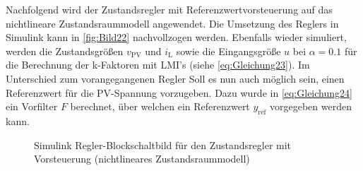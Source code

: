 Nachfolgend wird der Zustandsregler mit Referenzwertvorsteuerung auf das nichtlineare Zustandsraummodell angewendet. Die Umsetzung des Reglers in Simulink kann in \autoref{fig:Bild22} nachvollzogen werden. Ebenfalls wieder simuliert, werden die Zustandsgrößen $v_{\mathrm{PV}}$ und $i_{\mathrm{L}}$ sowie die Eingangsgröße $u$ bei $\alpha = 0.1$ für die Berechnung der k-Faktoren mit LMI's (siehe \autoref{eq:Gleichung23}). Im Unterschied zum vorangegangenen Regler Soll es nun auch möglich sein, einen Referenzwert für die PV-Spannung vorzugeben. Dazu wurde in \autoref{eq:Gleichung24} ein Vorfilter $F$ berechnet, über welchen ein Referenzwert $y_{\mathrm{ref}}$ vorgegeben werden kann.

\begin{figure}[H]
    \centering
    \caption[Zustandsregler mit Vorsteuerung Simulink (nichtlinear)]{Simulink Regler-Blockschaltbild für den Zustandsregler mit Vorsteuerung (nichtlineares Zustandsraummodell)}
    \label{fig:Bild22}
\end{figure}


